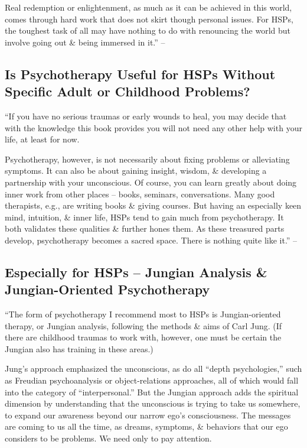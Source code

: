 \documentclass{article}
\numberwithin{equation}{section}
\begin{document}
Real redemption or enlightenment, as much as it can be achieved in this world, comes through hard work that does not skirt though personal issues. For HSPs, the toughest task of all may have nothing to do with renouncing the world but involve going out \& being immersed in it.'' -- \cite[pp. 212--214]{Aron2013}

\subsection{Is Psychotherapy Useful for HSPs Without Specific Adult or Childhood Problems?}
``If you have no serious traumas or early wounds to heal, you may decide that with the knowledge this book provides you will not need any other help with your life, at least for now.

Psychotherapy, however, is not necessarily about fixing problems or alleviating symptoms. It can also be about gaining insight, wisdom, \& developing a partnership with your unconscious. Of course, you can learn greatly about doing inner work from other places -- books, seminars, conversations. Many good therapists, e.g., are writing books \& giving courses. But having an especially keen mind, intuition, \& inner life, HSPs tend to gain much from psychotherapy. It both validates these qualities \& further hones them. As these treasured parts develop, psychotherapy becomes a sacred space. There is nothing quite like it.'' -- \cite[p. 214]{Aron2013}

\subsection{Especially for HSPs -- Jungian Analysis \& Jungian-Oriented Psychotherapy}
``The form of psychotherapy I recommend most to HSPs is Jungian-oriented therapy, or Jungian analysis, following the methods \& aims of Carl Jung. (If there are childhood traumas to work with, however, one must be certain the Jungian also has training in these areas.)

Jung's approach emphasized the unconscious, as do all ``depth psychologies,'' such as Freudian psychoanalysis or object-relations approaches, all of which would fall into the category of ``interpersonal.'' But the Jungian approach adds the spiritual dimension by understanding that the unconscious is trying to take us somewhere, to expand our awareness beyond our narrow ego's consciousness. The messages are coming to us all the time, as dreams, symptoms, \& behaviors that our ego considers to be problems. We need only to pay attention.
\end{document}
